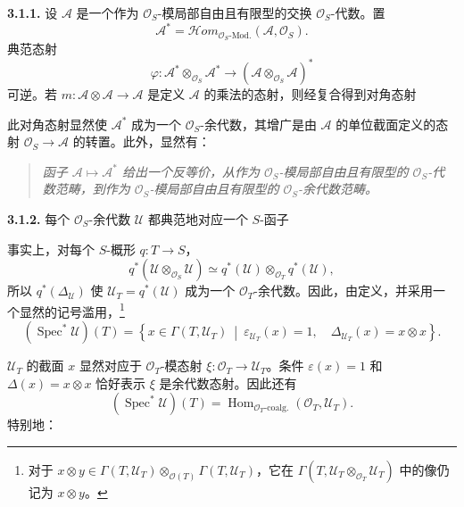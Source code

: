 \medskip
\noindent\textbf{3.1.1.}
\label{sga3:VIIA:3.1.1}
设 \(\mathcal A\) 是一个作为 \(\mathcal O_S\)-模局部自由且有限型的交换 \(\mathcal O_S\)-代数。置
\[
  \mathcal A^{*}
  =\mathcal Hom_{\mathcal O_S\text{-Mod.}}
    (\mathcal A,\mathcal O_S).
\]
典范态射
\[
  \varphi:\mathcal A^{*}\otimes_{\mathcal O_S}\mathcal A^{*}
  \longrightarrow
  (\mathcal A\otimes_{\mathcal O_S}\mathcal A)^{*}
\]
可逆。若 \(m:\mathcal A\otimes\mathcal A\to\mathcal A\) 是定义 \(\mathcal A\) 的乘法的态射，则经复合得到对角态射
\begin{center}
  \label{sga3:VIIA:3.1.1-dual-coalgebra-sequence}
  
\end{center}
此对角态射显然使 \(\mathcal A^{*}\) 成为一个 \(\mathcal O_S\)-余代数，其增广是由 \(\mathcal A\) 的单位截面定义的态射 \(\mathcal O_S\to\mathcal A\) 的转置。此外，显然有：

\begin{quote}
\itshape
函子 \(\mathcal A\mapsto\mathcal A^{*}\) 给出一个反等价，从作为 \(\mathcal O_S\)-模局部自由且有限型的 \(\mathcal O_S\)-代数范畴，到作为 \(\mathcal O_S\)-模局部自由且有限型的 \(\mathcal O_S\)-余代数范畴。
\end{quote}

\medskip
\noindent\textbf{3.1.2.}
\label{sga3:VIIA:3.1.2}
每个 \(\mathcal O_S\)-余代数 \(\mathcal U\) 都典范地对应一个 \(S\)-函子
\begin{center}
  \label{sga3:VIIA:3.1.2-spec-star-functor}
  
\end{center}
事实上，对每个 \(S\)-概形 \(q:T\to S\)，
\[
  q^{*}(\mathcal U\otimes_{\mathcal O_S}\mathcal U)
  \simeq
  q^{*}(\mathcal U)\otimes_{\mathcal O_T}q^{*}(\mathcal U),
\]
所以 \(q^{*}(\Delta_{\mathcal U})\) 使 \(\mathcal U_T=q^{*}(\mathcal U)\) 成为一个 \(\mathcal O_T\)-余代数。因此，由定义，并采用一个显然的记号滥用，\footnote{对于 \(x\otimes y\in
 \Gamma(T,\mathcal U_T)\otimes_{\mathcal O(T)}
 \Gamma(T,\mathcal U_T)\)，它在 \(\Gamma(T,\mathcal U_T\otimes_{\mathcal O_T}\mathcal U_T)\) 中的像仍记为 \(x\otimes y\)。}
\[
  (\operatorname{Spec}^{*}\mathcal U)(T)
  =
  \left\{
    x\in\Gamma(T,\mathcal U_T)
    \ \middle|\
    \varepsilon_{\mathcal U_T}(x)=1,\quad
    \Delta_{\mathcal U_T}(x)=x\otimes x
  \right\}.
\]

\(\mathcal U_T\) 的截面 \(x\) 显然对应于 \(\mathcal O_T\)-模态射 \(\xi:\mathcal O_T\to\mathcal U_T\)。条件 \(\varepsilon(x)=1\) 和 \(\Delta(x)=x\otimes x\) 恰好表示 \(\xi\) 是余代数态射。因此还有
\[
  (\operatorname{Spec}^{*}\mathcal U)(T)
  =
  \operatorname{Hom}_{\mathcal O_T\text{-coalg.}}
    (\mathcal O_T,\mathcal U_T).
\]
特别地：

